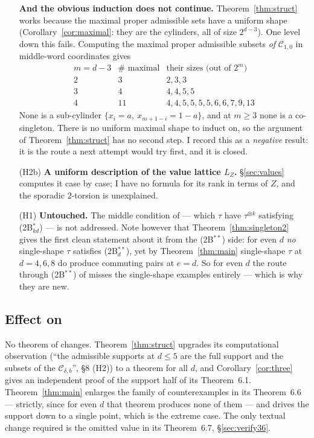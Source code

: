 \documentclass[11pt]{article}
\theoremstyle{definition}
\theoremstyle{remark}
\newcommand{\Cset}{\mathcal{C}}
\begin{document}
\begin{enumerate}
  \textbf{And the obvious induction does not continue.}  Theorem~\ref{thm:struct} works because
  the maximal proper admissible sets have a uniform shape (Corollary~\ref{cor:maximal}: they are
  the cylinders, all of size $2^{d-3}$).  One level down this fails.  Computing the maximal
  proper admissible subsets \emph{of} $\Cset_{1,0}$ in middle-word coordinates gives
  \[
  \begin{array}{r|l|l}
    m=d-3 & \#\text{ maximal} & \text{their sizes (out of } 2^{m})\\\hline
    2 & 3  & 2,3,3\\
    3 & 4  & 4,4,5,5\\
    4 & 11 & 4,4,5,5,5,5,6,6,7,9,13
  \end{array}
  \]
  None is a sub-cylinder $\{x_i=a,\ x_{m+1-i}=1-a\}$, and at $m\ge3$ none is a co-singleton.
  There is no uniform maximal shape to induct on, so the argument of
  Theorem~\ref{thm:struct} has no second step.  I record this as a \emph{negative} result: it
  is the route a next attempt would try first, and it is closed.
\item[(H2b)] \textbf{A uniform description of the value lattice $L_Z$.}  \S\ref{sec:values}
  computes it case by case; I have no formula for its rank in terms of $Z$, and the sporadic
  $2$-torsion is unexplained.
\item[(H1)] \textbf{Untouched.}  The middle condition of \cite[Rem.~5.2]{Q150c1} --- which
  $\tau$ have $\tau^{\otimes k}$ satisfying (2B$^*_{kd}$) --- is not addressed.  Note however
  that Theorem~\ref{thm:singleton2} gives the first clean statement about it from the (2B$^{**}$)
  side: for even $d$ \emph{no} single-shape $\tau$ satisfies (2B$^{**}_d$), yet by
  Theorem~\ref{thm:main} single-shape $\tau$ at $d=4,6,8$ do produce commuting pairs at
  $e=d$.  So for even $d$ the route through (2B$^{**}$) of \cite[Thm.~6.6]{Q150c1} misses the
  single-shape examples entirely --- which is why they are new.
\end{enumerate}

\subsection*{Effect on \cite{Q150c1}}

No theorem of \cite{Q150c1} changes.  Theorem~\ref{thm:struct} upgrades its computational
observation (``the admissible supports at $d\le5$ are the full support and the subsets of the
$\Cset_{\delta,b}$'', \S8 (H2)) to a theorem for all $d$, and Corollary~\ref{cor:three} gives an
independent proof of the support half of its Theorem~6.1.  Theorem~\ref{thm:main} enlarges the
family of counterexamples in its Theorem~6.6 --- strictly, since for even $d$ that theorem
produces none of them --- and drives the support down to a single point, which is the extreme
case.  The only textual change required is the omitted value in its Theorem~6.7,
\S\ref{sec:verify36}.
\end{document}
